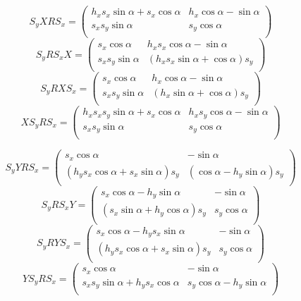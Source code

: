$$S_yXRS_x = \begin{pmatrix} h_x s_x \sin\alpha + s_x \cos\alpha & h_x \cos\alpha - \sin\alpha \\ s_x s_y \sin\alpha & s_y \cos\alpha \\ \end{pmatrix} $$
$$S_yRS_xX = \begin{pmatrix} s_x \cos\alpha & h_x s_x \cos\alpha - \sin\alpha \\ s_x s_y \sin\alpha & \left( h_x s_x \sin\alpha + \cos\alpha \right) s_y \\ \end{pmatrix} $$
$$S_yRXS_x = \begin{pmatrix} s_x \cos\alpha & h_x \cos\alpha - \sin\alpha \\ s_x s_y \sin\alpha & \left( h_x \sin\alpha + \cos\alpha \right) s_y \\ \end{pmatrix} $$
$$XS_yRS_x = \begin{pmatrix} h_x s_x s_y \sin\alpha + s_x \cos\alpha & h_x s_y \cos\alpha - \sin\alpha \\ s_x s_y \sin\alpha & s_y \cos\alpha \\ \end{pmatrix} $$

$$S_yYRS_x = \begin{pmatrix} s_x \cos\alpha & - \sin\alpha \\ \left( h_y s_x \cos\alpha + s_x \sin\alpha \right) s_y & \left( \cos\alpha - h_y \sin\alpha \right) s_y \\ \end{pmatrix} $$
$$S_yRS_xY = \begin{pmatrix} s_x \cos\alpha - h_y \sin\alpha & - \sin\alpha \\ \left( s_x \sin\alpha + h_y \cos\alpha \right) s_y & s_y \cos\alpha \\ \end{pmatrix} $$
$$S_yRYS_x = \begin{pmatrix} s_x \cos\alpha - h_y s_x \sin\alpha & - \sin\alpha \\ \left( h_y s_x \cos\alpha + s_x \sin\alpha \right) s_y & s_y \cos\alpha \\ \end{pmatrix} $$
$$YS_yRS_x = \begin{pmatrix} s_x \cos\alpha & - \sin\alpha \\ s_x s_y \sin\alpha + h_y s_x \cos\alpha & s_y \cos\alpha - h_y \sin\alpha \\ \end{pmatrix} $$ 

